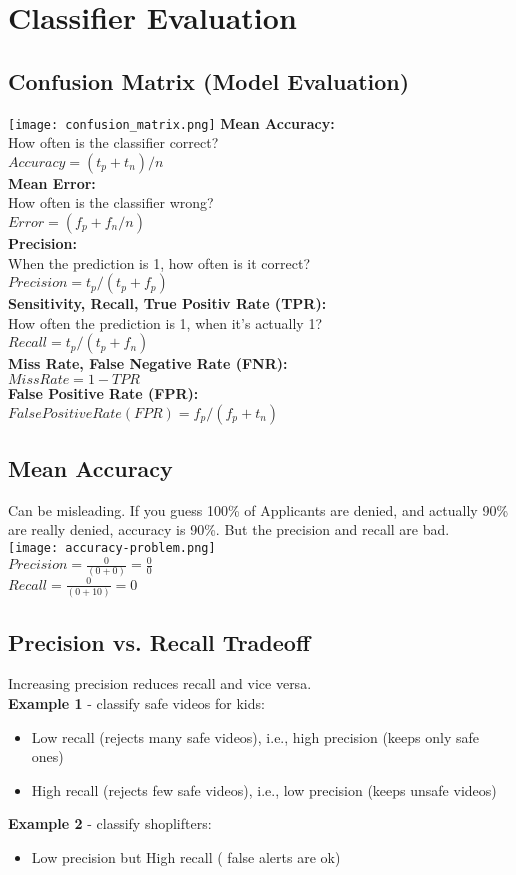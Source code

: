 \section{Classifier Evaluation}
\subsection{Confusion Matrix (Model Evaluation)}
\texttt{[image: confusion\_matrix.png]}
\textbf{Mean Accuracy:}\\
How often is the classifier correct?\\
$Accuracy = (t_p + t_n) / n$\\
\textbf{Mean Error:}\\
How often is the classifier wrong?\\
$Error = (f_p + f_n / n)$\\
\textbf{Precision:}\\
When the prediction is 1, how often is it correct?\\
$Precision = t_p / (t_p + f_p)$\\
\textbf{Sensitivity, Recall, True Positiv Rate (TPR):}\\
How often the prediction is 1, when it's actually 1?\\
$Recall = t_p / (t_p + f_n)$\\
\textbf{Miss Rate, False Negative Rate (FNR):}\\
$Miss Rate = 1 - TPR$\\
\textbf{False Positive Rate (FPR):}\\
$False Positive Rate (FPR) = f_p / ( f_p + t_n) $


\subsection{Mean Accuracy}
Can be misleading. If you guess 100\% of Applicants are denied, and actually 90\% are really denied, accuracy is 90\%.
But the precision and recall are bad.\\
\texttt{[image: accuracy-problem.png]}\\
$Precision = \frac{0}{(0 + 0)} = \frac{0}{0}$\\
$Recall = \frac{0}{(0 + 10)} = 0$

\subsection{Precision vs. Recall Tradeoff}
Increasing precision reduces recall and vice versa.\\
\textbf{Example 1} - classify safe videos for kids:
\begin{itemize}
  \item Low recall (rejects many safe videos), i.e., high precision (keeps only safe ones)
  \item High recall (rejects few safe videos), i.e., low precision (keeps unsafe videos)
\end{itemize}
\textbf{Example 2} - classify shoplifters:
\begin{itemize}
  \item Low precision but High recall ( false alerts are ok)
\end{itemize}

